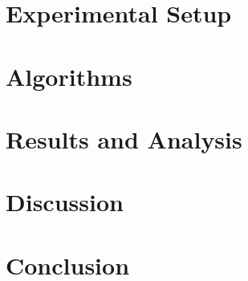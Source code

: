 \documentclass[twocolumn]{article}
\begin{document}
\section{Experimental Setup}


\section{Algorithms}


\section{Results and Analysis}




\section{Discussion}


\section{Conclusion}




\end{document}
